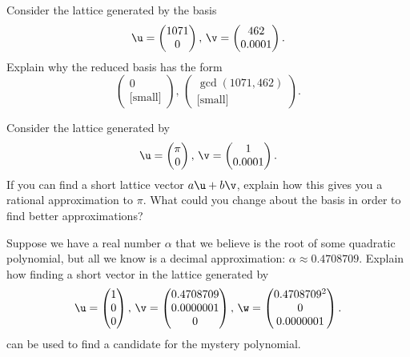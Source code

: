 \begin{explor}
	Consider the lattice generated by the basis
	\[\u=\begin{pmatrix}
	1071\\0
	\end{pmatrix},\,\v=\begin{pmatrix}
	462 \\ 0.0001
	\end{pmatrix}.\]
	Explain why the reduced basis has the form
	\[\begin{pmatrix}
	0\\\text{[small]}
	\end{pmatrix},\,\begin{pmatrix}
	\gcd(1071,462) \\ \text{[small]}
	\end{pmatrix}.\]
\end{explor}

\begin{explor}
	Consider the lattice generated by
	\[\u=\begin{pmatrix}
	\pi\\0
	\end{pmatrix},\,\v=\begin{pmatrix}
	1 \\ 0.0001
	\end{pmatrix}.\]
	If you can find a short lattice vector $a\u+b\v$, explain how this gives you a rational approximation to $\pi$. What could you change about the basis in order to find better approximations?
\end{explor}

\begin{explor}\label{exp:polyroot}
	Suppose we have a real number $\alpha$ that we believe is the root of some quadratic polynomial, but all we know is a decimal approximation: $\alpha\approx 0.4708709$. Explain how finding a short vector in the lattice generated by
	\[\u=\begin{pmatrix}
	1\\0\\0
	\end{pmatrix},\,\v=\begin{pmatrix}
	0.4708709 \\ 0.0000001 \\ 0
	\end{pmatrix},\,\w=\begin{pmatrix}
	0.4708709^2 \\ 0\\ 0.0000001
	\end{pmatrix}.\]
	can be used to find a candidate for the mystery polynomial.
\end{explor}


